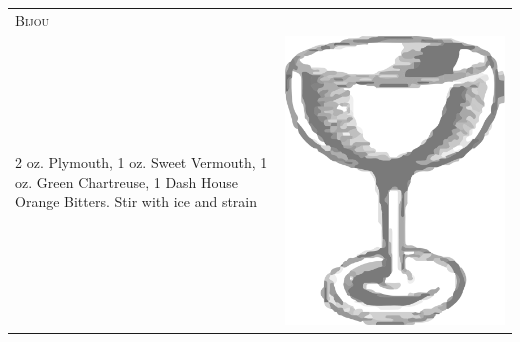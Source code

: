 \documentclass{article}
\begin{document}
\begin{multicols}{2}
\begin{tabular}{p{2in} p{0.5in}}
\multicolumn{2}{p{3in}}{\centering\Huge\textsc{Bijou}}\\ 
  \vspace{-0.1in}2 oz. Plymouth, 1 oz. Sweet Vermouth, 1 oz. Green Chartreuse, 1 Dash House Orange Bitters. Stir with ice and strain &
  \vspace{-0.1in} \includegraphics{egg_coupe.png}
\end{tabular}


\end{multicols}
\end{document}

